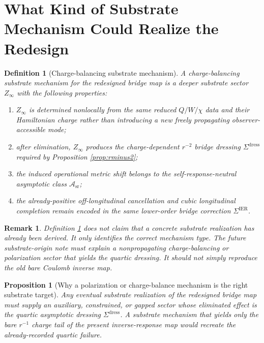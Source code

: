 \documentclass[11pt]{article}
\newcommand{\SigmaIER}{\Sigma^{\mathrm{IER}}}
\newcommand{\SigmaDress}{\Sigma^{\mathrm{dress}}}
\newcommand{\AsymClass}{\mathscr A_{\mathrm{sr}}}
\newcommand{\ChargeField}{Z_\infty}
\newtheorem{definition}{Definition}
\newtheorem{proposition}{Proposition}
\newtheorem{remark}{Remark}
\begin{document}
\section{What Kind of Substrate Mechanism Could Realize the Redesign}

\begin{definition}[Charge-balancing substrate mechanism]
\label{def:substrate}
A \emph{charge-balancing substrate mechanism} for the redesigned bridge map is a deeper substrate sector \(\ChargeField\) with the following properties:
\begin{enumerate}
    \item \(\ChargeField\) is determined nonlocally from the same reduced \(Q/W/\chi\) data and their Hamiltonian charge rather than introducing a new freely propagating observer-accessible mode;
    \item after elimination, \(\ChargeField\) produces the charge-dependent \(r^{-2}\) bridge dressing \(\SigmaDress\) required by Proposition \ref{prop:rminus2};
    \item the induced operational metric shift belongs to the self-response-neutral asymptotic class \(\AsymClass\);
    \item the already-positive off-longitudinal cancellation and cubic longitudinal completion remain encoded in the same lower-order bridge correction \(\SigmaIER\).
\end{enumerate}
\end{definition}

\begin{remark}
Definition \ref{def:substrate} does \emph{not} claim that a concrete substrate realization has already been derived. It only identifies the correct mechanism type. The future substrate-origin note must explain a nonpropagating charge-balancing or polarization sector that yields the quartic dressing. It should not simply reproduce the old bare Coulomb inverse map.
\end{remark}

\begin{proposition}[Why a polarization or charge-balance mechanism is the right substrate target]
\label{prop:substrateright}
Any eventual substrate realization of the redesigned bridge map must supply an auxiliary, constrained, or gapped sector whose eliminated effect is the quartic asymptotic dressing \(\SigmaDress\). A substrate mechanism that yields only the bare \(r^{-1}\) charge tail of the present inverse-response map would recreate the already-recorded quartic failure.
\end{proposition}
\end{document}
